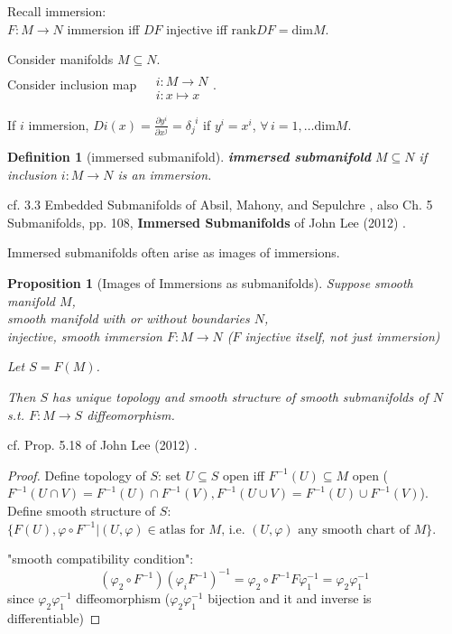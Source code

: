 \documentclass[10pt]{amsart}
\newtheorem{proposition}{Proposition}
\newtheorem{definition}{Definition}
\begin{document}
\begin{multicols*}{2}
Recall immersion:  \\
$F:M \to N$ immersion iff $DF$ injective iff $\text{rank}DF = \text{dim}M$.  

Consider manifolds $M\subseteq N$.  \\
Consider inclusion map $\begin{aligned} & \quad \\ 
	& i:M\to N \\
	& i: x \mapsto x \end{aligned}$.  
	
	If $i$ immersion, $Di(x) = \frac{\partial y^i}{ \partial x^j} = \delta_j^{\  \  i}$ if $y^i = x^i$, $\forall \, i =1,\dots \text{dim}M$.  
	
\begin{definition}[immersed submanifold]
	\textbf{immersed submanifold} $M \subseteq N$ if inclusion $i:M\to N$ is an immersion.  
\end{definition}	
cf. 3.3 Embedded Submanifolds of Absil, Mahony, and Sepulchre \cite{AMS2008}, also Ch. 5 Submanifolds, pp. 108, \textbf{Immersed Submanifolds} of  John Lee (2012) \cite{JLee2012}.  

Immersed submanifolds often arise as images of immersions.  

\begin{proposition}[Images of Immersions as submanifolds]
	Suppose smooth manifold $M$, \\
	\phantom{Suppose } smooth manifold with or without boundaries $N$, \\
	injective, smooth immersion $F:M\to N$ ($F$ injective itself, not just immersion)  
	
Let $S=F(M)$.  

Then $S$ has unique topology and smooth structure of smooth submanifolds of $N$ s.t. $F:M\to S$ diffeomorphism.  
	
\end{proposition}
cf. Prop. 5.18 of John Lee (2012) \cite{JLee2012}.  

\begin{proof}
Define topology of $S$: set $U\subseteq S$ open iff $F^{-1}(U) \subseteq M$ open ($F^{-1}(U\cap V) = F^{-1}(U) \cap F^{-1}(V), F^{-1}(U\cup V) =F^{-1}(U) \cup F^{-1}(V)$).  \\
Define smooth structure of $S$: $\lbrace F(U), \varphi \circ F^{-1}  | (U,\varphi) \in \text{atlas for $M$, i.e. $(U,\varphi)$ any smooth chart of $M$}\rbrace$.  

"smooth compatibility condition": 
\[
(\varphi_2\circ F^{-1}) (\varphi_i F^{-1})^{-1} = \varphi_2 \circ F^{-1}F\varphi_1^{-1} = \varphi_2 \varphi_1^{-1}
\]
since $\varphi_2\varphi_1^{-1}$ diffeomorphism ($\varphi_2 \varphi_1^{-1}$ bijection and it and inverse is differentiable) 


\end{proof}
\end{multicols*}
\end{document}
